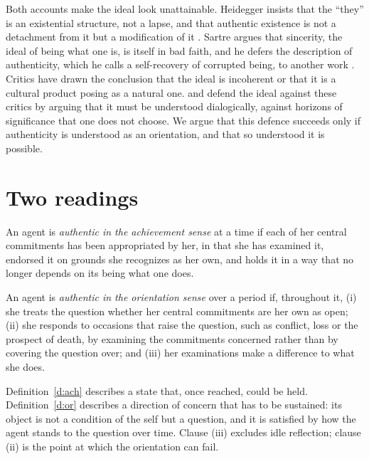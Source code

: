 \documentclass{situationist-preprint}
\begin{document}
Both accounts make the ideal look unattainable. Heidegger insists that the \enquote{they} is an existential structure, not a lapse, and that authentic existence is not a detachment from it but a modification of it \citep[\S 27]{Heidegger1927}. Sartre argues that sincerity, the ideal of being what one is, is itself in bad faith, and he defers the description of authenticity, which he calls a self-recovery of corrupted being, to another work \citep[Part I, ch.~2]{Sartre1943}. Critics have drawn the conclusion that the ideal is incoherent or that it is a cultural product posing as a natural one. \citet{Taylor1991} and \citet{Guignon2004} defend the ideal against these critics by arguing that it must be understood dialogically, against horizons of significance that one does not choose. We argue that this defence succeeds only if authenticity is understood as an orientation, and that so understood it is possible.

\section{Two readings}

\begin{definition}[Achievement]\label{d:ach}
An agent is \emph{authentic in the achievement sense} at a time if each of her central commitments has been appropriated by her, in that she has examined it, endorsed it on grounds she recognizes as her own, and holds it in a way that no longer depends on its being what one does.
\end{definition}

\begin{definition}[Orientation]\label{d:or}
An agent is \emph{authentic in the orientation sense} over a period if, throughout it, (i) she treats the question whether her central commitments are her own as open; (ii) she responds to occasions that raise the question, such as conflict, loss or the prospect of death, by examining the commitments concerned rather than by covering the question over; and (iii) her examinations make a difference to what she does.
\end{definition}

Definition~\ref{d:ach} describes a state that, once reached, could be held. Definition~\ref{d:or} describes a direction of concern that has to be sustained: its object is not a condition of the self but a question, and it is satisfied by how the agent stands to the question over time. Clause (iii) excludes idle reflection; clause (ii) is the point at which the orientation can fail.
\end{document}
